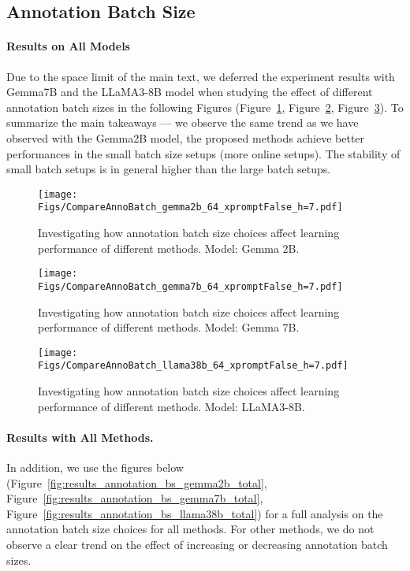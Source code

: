\subsection{Annotation Batch Size}
\label{appdx:more_results_annotation_bs}
\paragraph{Results on All Models}
Due to the space limit of the main text, we deferred the experiment results with Gemma7B and the LLaMA3-8B model when studying the effect of different annotation batch sizes in the following Figures (Figure~\ref{fig:results_annotation_bs_gemma2b_zoom}, Figure~\ref{fig:results_annotation_bs_gemma7b_zoom}, Figure~\ref{fig:results_annotation_bs_llama38b_zoom}). 
To summarize the main takeaways --- we observe the same trend as we have observed with the Gemma2B model, the proposed methods achieve better performances in the small batch size setups (more online setups). The stability of small batch setups is in general higher than the large batch setups.


\begin{figure}[h!]
    \centering
    \texttt{[image: Figs/CompareAnnoBatch\_gemma2b\_64\_xpromptFalse\_h=7.pdf]}
    \caption{\small Investigating how annotation batch size choices affect learning performance of different methods. Model: Gemma 2B.}
    \label{fig:results_annotation_bs_gemma2b_zoom}
\end{figure}


\begin{figure}[h!]
    \centering
    \texttt{[image: Figs/CompareAnnoBatch\_gemma7b\_64\_xpromptFalse\_h=7.pdf]}
    \caption{\small Investigating how annotation batch size choices affect learning performance of different methods. Model: Gemma 7B.}
    \label{fig:results_annotation_bs_gemma7b_zoom}
\end{figure}

\begin{figure}[h!]
    \centering
    \texttt{[image: Figs/CompareAnnoBatch\_llama38b\_64\_xpromptFalse\_h=7.pdf]}
    \caption{\small Investigating how annotation batch size choices affect learning performance of different methods. Model: LLaMA3-8B.}
    \label{fig:results_annotation_bs_llama38b_zoom}
\end{figure}

\paragraph{Results with All Methods.}
In addition, we use the figures below (Figure~\ref{fig:results_annotation_bs_gemma2b_total}, Figure~\ref{fig:results_annotation_bs_gemma7b_total}, Figure~\ref{fig:results_annotation_bs_llama38b_total}) for a full analysis on the annotation batch size choices for all methods. For other methods, we do not observe a clear trend on the effect of increasing or decreasing annotation batch sizes.


